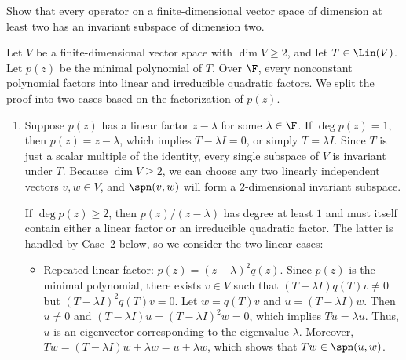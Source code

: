 \begin{exercise}
Show that every operator on a finite-dimensional vector space of dimension at
least two has an invariant subspace of dimension two.
\end{exercise}
\begin{solution}
Let $V$ be a finite-dimensional vector space with $\dim V\ge2$, and let
$T\in\Lin(V)$. Let $p(z)$ be the minimal polynomial of $T$. Over $\F$, every
nonconstant polynomial factors into linear and irreducible quadratic factors.
We split the proof into two cases based on the factorization of $p(z)$.
\begin{enumerate}[label=\arabic*)]
\item Suppose $p(z)$ has a linear factor $z-\lambda$ for some $\lambda\in\F$.
  If $\deg p(z)=1$, then $p(z)=z-\lambda$, which implies $T-\lambda I=0$, or
  simply $T=\lambda I$. Since $T$ is just a scalar multiple of the identity,
  every single subspace of $V$ is invariant under $T$. Because $\dim V\ge2$,
  we can choose any two linearly independent vectors $v,w\in V$, and
  $\spn(v,w)$ will form a $2$-dimensional invariant subspace.

  If $\deg p(z)\ge2$, then $p(z)/(z-\lambda)$ has degree at least $1$ and must
  itself contain either a linear factor or an irreducible quadratic factor.
  The latter is handled by Case~2 below, so we consider the two linear cases:
  \begin{itemize}
  \item Repeated linear factor: $p(z)=(z-\lambda)^2q(z)$. Since $p(z)$ is the
    minimal polynomial, there exists $v\in V$ such that
    $(T-\lambda I)q(T)v\ne0$ but $(T-\lambda I)^2q(T)v=0$. Let $w=q(T)v$ and
    $u=(T-\lambda I)w$. Then $u\ne0$ and
    $(T-\lambda I)u=(T-\lambda I)^2w=0$, which implies $Tu=\lambda u$. Thus,
    $u$ is an eigenvector corresponding to the eigenvalue $\lambda$.
    Moreover, $Tw=(T-\lambda I)w+\lambda w=u+\lambda w$, which shows that
    $Tw\in\spn(u,w)$.


\end{itemize}
\end{enumerate}
\end{solution}
